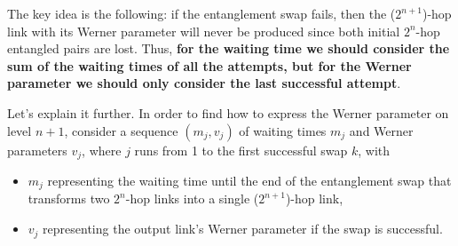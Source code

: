 \documentclass{masterthesis}
\begin{document}




The key idea 
is the following: if the entanglement swap fails, then the ($2^{n+1}$)-hop link with its Werner parameter will never be produced since both initial $2^{n}$-hop entangled pairs are lost. Thus, \textbf{for the waiting time we should consider the sum of the waiting times of all the attempts, but for the Werner parameter we should only consider the last successful attempt}.

Let's explain it further.
In order to find how to express the Werner parameter on level $n+1$, consider a sequence $\left(m_{j}, v_{j}\right)$ of waiting times $m_{j}$ and Werner parameters $v_{j}$, where $j$ runs from 1 to the first successful swap $k$, with
\begin{itemize}
    \item $m_{j}$ representing the waiting time until the end of the entanglement swap that transforms two $2^{n}$-hop links into a single ($2^{n+1}$)-hop link,
    \item $v_{j}$ representing the output link's Werner parameter if the swap is successful. 
\end{itemize}
\end{document}
